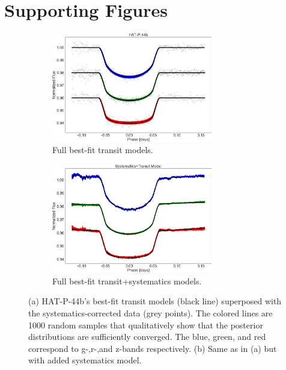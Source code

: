 \appendix

\chapter{Supporting Figures}

\begin{figure}
\centering
\begin{subfigure}{.5\textwidth}
\includegraphics[width=7cm]{hatp44/1000_posterior_samples.png}
\caption{Full best-fit transit models.}
\end{subfigure}%
\begin{subfigure}{.5\textwidth}
\includegraphics[width=7cm]{hatp44/transit_with_sys.png}
\caption{Full best-fit transit+systematics models.}
\end{subfigure}
\caption{(a) HAT-P-44b's best-fit transit models (black line) superposed with the systematics-corrected data (grey points). The colored lines are 1000 random samples that qualitatively show that the posterior distributions are sufficiently converged. The blue, green, and red correspond to g-,r-,and z-bands respectively. (b) Same as in (a) but with added systematics model.}
\label{fig:hatp44_samples}
\end{figure}

